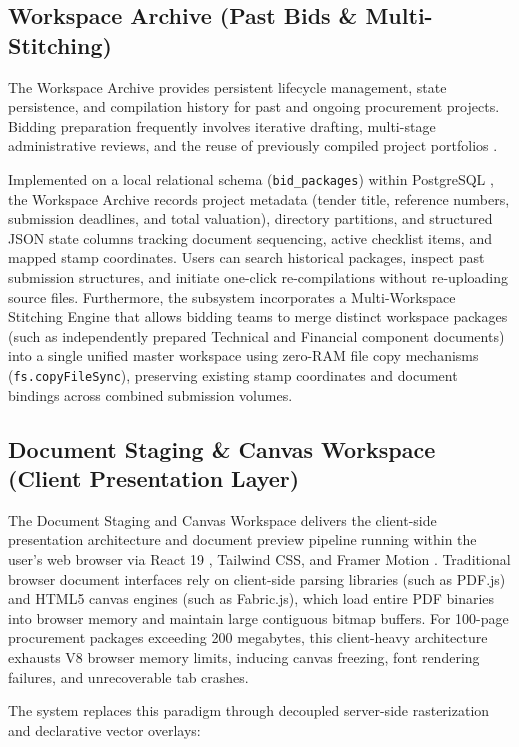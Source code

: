 \subsection{Workspace Archive (Past Bids \& Multi-Stitching)}
The Workspace Archive provides persistent lifecycle management, state persistence, and compilation history for past and ongoing procurement projects.
Bidding preparation frequently involves iterative drafting, multi-stage administrative reviews, and the reuse of previously compiled project portfolios \cite{ref45}.

Implemented on a local relational schema (\texttt{bid\_packages}) within PostgreSQL \cite{ref55}, the Workspace Archive records project metadata (tender title, reference numbers, submission deadlines, and total valuation), directory partitions, and structured JSON state columns tracking document sequencing, active checklist items, and mapped stamp coordinates.
Users can search historical packages, inspect past submission structures, and initiate one-click re-compilations without re-uploading source files.
Furthermore, the subsystem incorporates a Multi-Workspace Stitching Engine that allows bidding teams to merge distinct workspace packages (such as independently prepared Technical and Financial component documents) into a single unified master workspace using zero-RAM file copy mechanisms (\texttt{fs.copyFileSync}), preserving existing stamp coordinates and document bindings across combined submission volumes.

\subsection{Document Staging \& Canvas Workspace (Client Presentation Layer)}
The Document Staging and Canvas Workspace delivers the client-side presentation architecture and document preview pipeline running within the user's web browser via React 19 \cite{ref36}, Tailwind CSS, and Framer Motion \cite{ref38}.
Traditional browser document interfaces rely on client-side parsing libraries (such as PDF.js) and HTML5 canvas engines (such as Fabric.js), which load entire PDF binaries into browser memory and maintain large contiguous bitmap buffers.
For 100-page procurement packages exceeding 200 megabytes, this client-heavy architecture exhausts V8 browser memory limits, inducing canvas freezing, font rendering failures, and unrecoverable tab crashes.

The system replaces this paradigm through decoupled server-side rasterization and declarative vector overlays:

